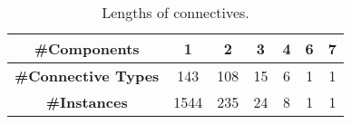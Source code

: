 \begin{table}[ht]
\centering
\begin{tabular}{|c|c|c|c|c|c|c|}
\hline
\bf \#Components        & 1    & 2   & 3  & 4 & 6 & 7 \\ \hline
\bf \#Connective Types  & 143  & 108 & 15 & 6 & 1 & 1 \\ \hline
\bf \#Instances         & 1544 & 235 & 24 & 8 & 1 & 1 \\ \hline
\end{tabular}
\caption{\label{t:connective-length} Lengths of connectives.}
\end{table}
